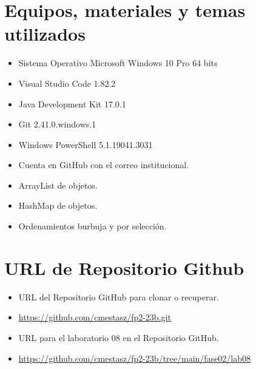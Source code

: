 \documentclass{article}
\begin{document}
\section{Equipos, materiales y temas utilizados}
\begin{itemize}
	\item Sistema Operativo Microsoft Windows 10 Pro 64 bits
	\item Visual Studio Code 1.82.2
	\item Java Development Kit 17.0.1
	\item Git 2.41.0.windows.1
	\item Windows PowerShell 5.1.19041.3031
	\item Cuenta en GitHub con el correo institucional.
	\item ArrayList de objetos.
	\item HashMap de objetos.
	\item Ordenamientos burbuja y por selección.
\end{itemize}

\section{URL de Repositorio Github}
\begin{itemize}
	\item URL del Repositorio GitHub para clonar o recuperar.
	\item \url{https://github.com/cmestasz/fp2-23b.git}
	\item URL para el laboratorio 08 en el Repositorio GitHub.
	\item \url{https://github.com/cmestasz/fp2-23b/tree/main/fase02/lab08}
\end{itemize}
\end{document}

